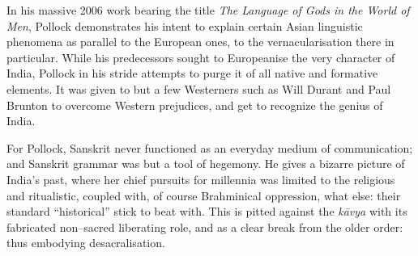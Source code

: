 In his massive 2006 work bearing the title \textit{The Language of Gods in the World of Men}, Pollock demonstrates his intent to explain certain Asian linguistic phenomena as parallel to the European ones, to the vernacularisation there in particular. While his predecessors sought to Europeanise the very character of India, Pollock in his stride attempts to purge it of all native and formative elements. It was given to but a few Westerners such as Will Durant and Paul Brunton to overcome Western prejudices, and get to recognize the genius of India.

For Pollock, Sanskrit never functioned as an everyday medium of communication; and Sanskrit grammar was but a tool of hegemony. He gives a bizarre picture of India’s past, where her chief pursuits for millennia was limited to the religious and ritualistic, coupled with, of course Brahminical oppression, what else: their standard “historical” stick to beat with. This is pitted against the \textit{kāvya} with its fabricated non–sacred liberating role, and as a clear break from the older order: thus embodying desacralisation.

